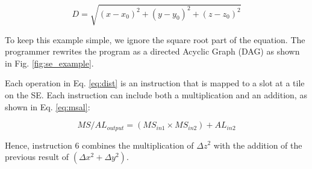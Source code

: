 \begin{equation}
    \label{eq:dist}
    D = \sqrt{(x - x_0)^2 +(y - y_0)^2 + (z - z_0)^2}
\end{equation}

To keep this example simple, we ignore the square root part of the equation.
The programmer rewrites the program as a directed Acyclic Graph (DAG) as shown in Fig. \ref{fig:se_example}.

Each operation in Eq. \ref{eq:dist} is an instruction that is mapped to a slot at a tile on the SE.
Each instruction can include both a multiplication and an addition, as shown in Eq. \ref{eq:msal}:

\begin{equation}
    \label{eq:msal}
    MS/AL_{output} = (MS_{in1} \times MS_{in2}) + AL_{in2} 
\end{equation}

Hence, instruction 6 combines the multiplication of $\Delta z^2$ with the addition of the previous result of $(\Delta x^2 + \Delta y^2)$.

